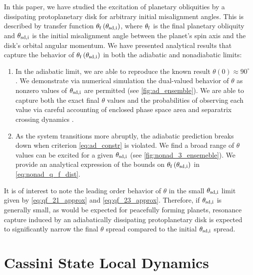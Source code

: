 \documentclass[
        fleqn,
        usenatbib,
        referee,
    ]{mnras}
\newcommand*{\p}[1]{\left(#1\right)}
\begin{document}
In this paper, we have studied the excitation of planetary obliquities by a
dissipating protoplanetary disk for arbitrary initial misalignment angles. This
is described by transfer function $\theta_{\rm f}\p{\theta_{\rm sd, i}}$, where
$\theta_{\rm f}$ is the final planetary obliquity and $\theta_{\rm sd, i}$ is
the initial misalignment angle between the planet's spin axis and the disk's
orbital angular momentum. We have presented analytical results that capture the
behavior of $\theta_{\rm f}\p{\theta_{\rm sd, i}}$ in both the adiabatic and
nonadiabatic
limits:
\begin{enumerate}
    \item In the adiabatic limit, we are able to reproduce the known result
        $\theta(0) \approx 90^\circ$ \citep{millholland_disk}. We demonstrate
        via numerical simulation the dual-valued behavior of $\theta$ as nonzero
        values of $\theta_{\rm sd, i}$ are permitted (see
        \autoref{fig:ad_ensemble}). We are able to capture both the exact final
        $\theta$ values and the probabilities of observing each value via
        careful accounting of enclosed phase space area and separatrix crossing
        dynamics \citep{henrard1982,henrard1987}.

    \item As the system transitions more abruptly, the adiabatic prediction
        breaks down when criterion \autoref{eq:ad_constr} is violated. We find a
        broad range of $\theta$ values can be excited for a given $\theta_{\rm
        sd, i}$ (see \autoref{fig:nonad_3_ensemeble}). We provide an analytical
        expression of the bounds on $\theta_{\rm f}\p{\theta_{\rm sd, i}}$ in
        \autoref{eq:nonad_q_f_dist}.
\end{enumerate}

It is of interest to note the leading order behavior of $\theta$ in the small
$\theta_{\rm sd, i}$ limit given by \autoref{eq:qf_21_approx} and
\autoref{eq:qf_23_approx}. Therefore, if $\theta_{\rm sd, i}$ is generally
small, as would be expected for peacefully forming planets, resonance capture
induced by an adiabatically dissipating protoplanetary disk is expected to
significantly narrow the final $\theta$ spread compared to the initial
$\theta_{\rm sd, i}$ spread.




\appendix

\section{Cassini State Local Dynamics}\label{s:local_dynamics}
\end{document}
